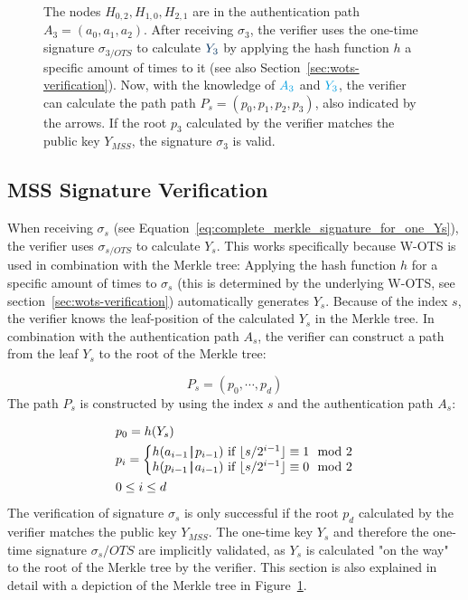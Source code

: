 \begin{figure}
{The nodes $H_{0,2}, H_{1,0}, H_{2,1}$ are in the \textcolor{cyan_tud}{authentication path $A_3 = (a_0, a_1, a_2)$}. After receiving $\sigma_3$, the verifier uses the one-time signature \textcolor{cyan_tud}{$\sigma_{3/OTS}$} to calculate $\textcolor{darkblue_tud}{Y_3}$ by applying the hash function $h$ a specific amount of times to it (see also Section~\ref{sec:wots-verification}).
Now, with the knowledge of $\textcolor{cyan_tud}{A_3}$ and $\textcolor{cyan_tud}{Y_3}$, the verifier can calculate the path \textcolor{darkblue_tud}{path $P_s = (p_0, p_1, p_2, p_3)$}, also indicated by the arrows. If the root $p_3$ calculated by the verifier matches the public key $Y_{MSS}$, the signature $\sigma_3$ is valid.}
\label{img:merkle_tree_signature_gen}
\end{figure}


\subsection{MSS Signature Verification}
When receiving $\sigma_s$ (see Equation~\ref{eq:complete_merkle_signature_for_one_Ys}), the verifier uses $\sigma_{s/OTS}$ to calculate $Y_s$. This works specifically because W-OTS is used in combination with the Merkle tree: Applying the hash function $h$ for a specific amount of times to $\sigma_s$ (this is determined by the underlying W-OTS, see section~\ref{sec:wots-verification}) automatically generates $Y_s$.
Because of the index $s$, the verifier knows the leaf-position of the calculated $Y_s$ in the Merkle tree. 
In combination with the authentication path $A_s$, the verifier can construct a path from the leaf $Y_s$ to the root of the Merkle tree: 

\begin{equation}
P_s = (p_0, \cdots, p_d)
\end{equation}
The path $P_s$ is constructed by using the index $s$ and the authentication path $A_s$:

\begin{align}
\label{eq:merkle_verifier_path_calculation}
&p_0 = h(Y_s) \\
&p_{i} = 
\left\{\begin{matrix} \nonumber
h(a_{i-1} \operatorname{|\!\!|} p_{i-1}) \text{ if } \lfloor s/2^{i-1}\rfloor \equiv 1 \mod{2} \\
h(p_{i-1} \operatorname{|\!\!|} a_{i-1}) \text{ if } \lfloor s/2^{i-1}\rfloor \equiv 0 \mod{2}
\end{matrix}\right.  \nonumber \\
&0 \leq i \leq d  \nonumber 
\end{align}
The verification of signature $\sigma_s$ is only successful if the root $p_d$ calculated by the verifier matches the public key $Y_{MSS}$. The one-time key $Y_s$ and therefore the one-time signature $\sigma_s/OTS$ are implicitly validated, as $Y_s$ is calculated "on the way" to the root of the Merkle tree by the verifier.
This section is also explained in detail with a depiction of the Merkle tree in Figure~\ref{img:merkle_tree_signature_gen}.

